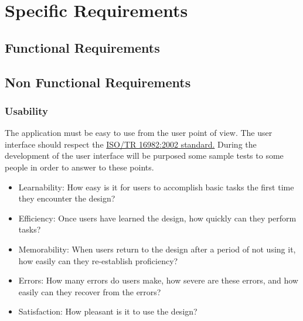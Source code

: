 \documentclass[english]{article}
\begin{document}
\section{Specific Requirements}
	\subsection{Functional Requirements}
	\subsection{Non Functional Requirements}
		\subsubsection{Usability}
		The application must be easy to use from the user point of view. The user interface should respect the \href{https://www.iso.org/obp/ui/#iso:std:iso:tr:16982:ed-1:v1:en}{ISO/TR 16982:2002 standard.} 
During the development of the user interface will be purposed some sample tests to some people in order to answer to these points.
	\begin{itemize}
		\item Learnability: How easy is it for users to accomplish basic tasks the first time they encounter the design?
		\item Efficiency: Once users have learned the design, how quickly can they perform tasks?
		\item Memorability: When users return to the design after a period of not using it, how easily can they re-establish proficiency?
		\item Errors: How many errors do users make, how severe are these errors, and how easily can they recover from the errors?
		\item Satisfaction: How pleasant is it to use the design?
	\end{itemize}
\end{document}
